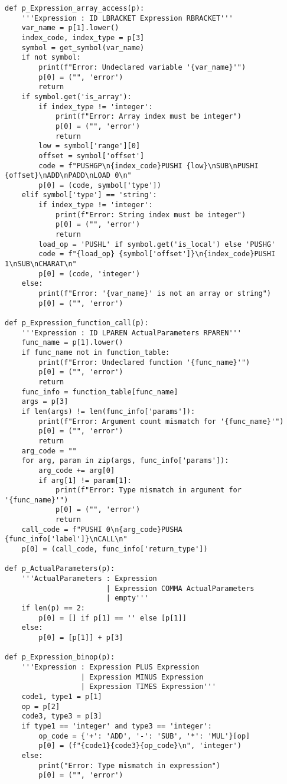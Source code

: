 \documentclass[12pt,a4paper]{report}%
\begin{document}
\begin{lstlisting}[style=pythonStyle, caption={Ficheiro lex.py}]
def p_Expression_array_access(p):
    '''Expression : ID LBRACKET Expression RBRACKET'''
    var_name = p[1].lower()
    index_code, index_type = p[3]
    symbol = get_symbol(var_name)
    if not symbol:
        print(f"Error: Undeclared variable '{var_name}'")
        p[0] = ("", 'error')
        return
    if symbol.get('is_array'):
        if index_type != 'integer':
            print(f"Error: Array index must be integer")
            p[0] = ("", 'error')
            return
        low = symbol['range'][0]
        offset = symbol['offset']
        code = f"PUSHGP\n{index_code}PUSHI {low}\nSUB\nPUSHI {offset}\nADD\nPADD\nLOAD 0\n"
        p[0] = (code, symbol['type'])
    elif symbol['type'] == 'string':
        if index_type != 'integer':
            print(f"Error: String index must be integer")
            p[0] = ("", 'error')
            return
        load_op = 'PUSHL' if symbol.get('is_local') else 'PUSHG'
        code = f"{load_op} {symbol['offset']}\n{index_code}PUSHI 1\nSUB\nCHARAT\n"
        p[0] = (code, 'integer')
    else:
        print(f"Error: '{var_name}' is not an array or string")
        p[0] = ("", 'error')

def p_Expression_function_call(p):
    '''Expression : ID LPAREN ActualParameters RPAREN'''
    func_name = p[1].lower()
    if func_name not in function_table:
        print(f"Error: Undeclared function '{func_name}'")
        p[0] = ("", 'error')
        return
    func_info = function_table[func_name]
    args = p[3]
    if len(args) != len(func_info['params']):
        print(f"Error: Argument count mismatch for '{func_name}'")
        p[0] = ("", 'error')
        return
    arg_code = ""
    for arg, param in zip(args, func_info['params']):
        arg_code += arg[0]
        if arg[1] != param[1]:
            print(f"Error: Type mismatch in argument for '{func_name}'")
            p[0] = ("", 'error')
            return
    call_code = f"PUSHI 0\n{arg_code}PUSHA {func_info['label']}\nCALL\n"
    p[0] = (call_code, func_info['return_type'])

def p_ActualParameters(p):
    '''ActualParameters : Expression
                        | Expression COMMA ActualParameters
                        | empty'''
    if len(p) == 2:
        p[0] = [] if p[1] == '' else [p[1]]
    else:
        p[0] = [p[1]] + p[3]

def p_Expression_binop(p):
    '''Expression : Expression PLUS Expression
                  | Expression MINUS Expression
                  | Expression TIMES Expression'''
    code1, type1 = p[1]
    op = p[2]
    code3, type3 = p[3]
    if type1 == 'integer' and type3 == 'integer':
        op_code = {'+': 'ADD', '-': 'SUB', '*': 'MUL'}[op]
        p[0] = (f"{code1}{code3}{op_code}\n", 'integer')
    else:
        print("Error: Type mismatch in expression")
        p[0] = ("", 'error')


\end{lstlisting}
\end{document}
